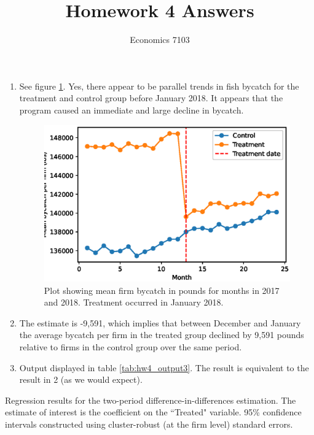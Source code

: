 \documentclass{article}
\title{Homework 4 Answers}
\author{Economics 7103}
\date{ }
\begin{document}
  
\maketitle

\begin{enumerate}
\item See figure \ref{fig:hw4_q1}.  Yes, there appear to be parallel trends in fish bycatch for the treatment and control group before January 2018.  It appears that the program caused an immediate and large decline in bycatch.
\begin{figure}[h]
    \centering
    \includegraphics[scale = 0.7]{hw4_q1.eps}
    \caption{Plot showing mean firm bycatch in pounds for months in 2017 and 2018.  Treatment occurred in January 2018.}
    \label{fig:hw4_q1}
\end{figure}
\item The estimate is -9,591, which implies that between December and January the average bycatch per firm in the treated group declined by 9,591 pounds relative to firms in the control group over the same period.
\item Output displayed in table \ref{tab:hw4_output3}.  The result is equivalent to the result in 2 (as we would expect).
\end{enumerate}

\begin{table}[h]
    \centering
    
    \caption{Regression results for the two-period difference-in-differences estimation.  The estimate of interest is the coefficient on the ``Treated" variable. 95\% confidence intervals constructed using cluster-robust (at the firm level) standard errors.}
    \label{tab:hw4_output3}
\end{table}
\end{document}
